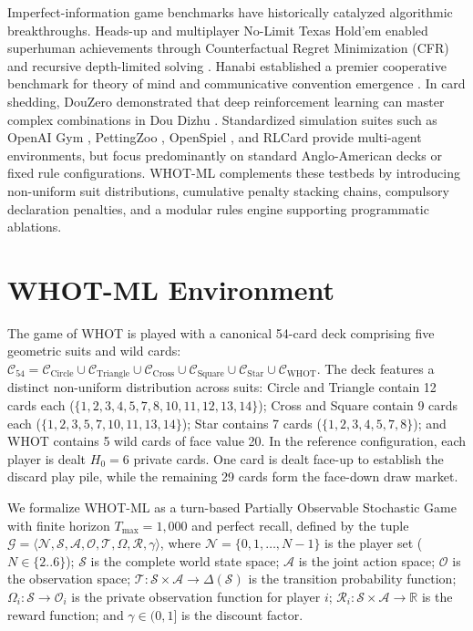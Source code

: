 \documentclass[journal]{IEEEtran}
\begin{document}
Imperfect-information game benchmarks have historically catalyzed algorithmic breakthroughs. Heads-up and multiplayer No-Limit Texas Hold'em enabled superhuman achievements through Counterfactual Regret Minimization (CFR) and recursive depth-limited solving \cite{bowling2015heads,moravcik2017deepstack,brown2018superhuman,brown2019superhuman}. Hanabi established a premier cooperative benchmark for theory of mind and communicative convention emergence \cite{bard2020hanabi}. In card shedding, DouZero demonstrated that deep reinforcement learning can master complex combinations in Dou Dizhu \cite{zha2021douzero}. Standardized simulation suites such as OpenAI Gym \cite{brockman2016openai}, PettingZoo \cite{terry2021pettingzoo}, OpenSpiel \cite{lanctot2019openspiel}, and RLCard \cite{zha2020rlcard} provide multi-agent environments, but focus predominantly on standard Anglo-American decks or fixed rule configurations. WHOT-ML complements these testbeds by introducing non-uniform suit distributions, cumulative penalty stacking chains, compulsory declaration penalties, and a modular rules engine supporting programmatic ablations.

\section{WHOT-ML Environment}
The game of WHOT is played with a canonical 54-card deck comprising five geometric suits and wild cards: $\mathcal{C}_{54} = \mathcal{C}_{\text{Circle}} \cup \mathcal{C}_{\text{Triangle}} \cup \mathcal{C}_{\text{Cross}} \cup \mathcal{C}_{\text{Square}} \cup \mathcal{C}_{\text{Star}} \cup \mathcal{C}_{\text{WHOT}}$. The deck features a distinct non-uniform distribution across suits: Circle and Triangle contain 12 cards each ($\{1, 2, 3, 4, 5, 7, 8, 10, 11, 12, 13, 14\}$); Cross and Square contain 9 cards each ($\{1, 2, 3, 5, 7, 10, 11, 13, 14\}$); Star contains 7 cards ($\{1, 2, 3, 4, 5, 7, 8\}$); and WHOT contains 5 wild cards of face value 20. In the reference configuration, each player is dealt $H_0 = 6$ private cards. One card is dealt face-up to establish the discard play pile, while the remaining 29 cards form the face-down draw market.

We formalize WHOT-ML as a turn-based Partially Observable Stochastic Game with finite horizon $T_{\max}=1{,}000$ and perfect recall, defined by the tuple $\mathcal{G} = \langle \mathcal{N}, \mathcal{S}, \mathcal{A}, \mathcal{O}, \mathcal{T}, \Omega, \mathcal{R}, \gamma \rangle$, where $\mathcal{N} = \{0, 1, \dots, N-1\}$ is the player set ($N \in \{2..6\}$); $\mathcal{S}$ is the complete world state space; $\mathcal{A}$ is the joint action space; $\mathcal{O}$ is the observation space; $\mathcal{T}: \mathcal{S} \times \mathcal{A} \to \Delta(\mathcal{S})$ is the transition probability function; $\Omega_i: \mathcal{S} \to \mathcal{O}_i$ is the private observation function for player $i$; $\mathcal{R}_i: \mathcal{S} \times \mathcal{A} \to \mathbb{R}$ is the reward function; and $\gamma \in (0, 1]$ is the discount factor.
\end{document}
